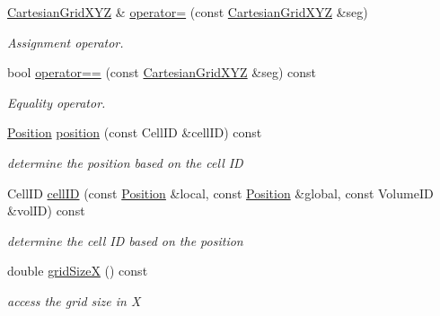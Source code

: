 \begin{DoxyCompactItemize}
\hyperlink{class_d_d4hep_1_1_geometry_1_1_cartesian_grid_x_y_z}{CartesianGridXYZ} \& \hyperlink{class_d_d4hep_1_1_geometry_1_1_cartesian_grid_x_y_z_aee2dbcb91803bc3d6ca773ae722ce716}{operator=} (const \hyperlink{class_d_d4hep_1_1_geometry_1_1_cartesian_grid_x_y_z}{CartesianGridXYZ} \&seg)
\begin{DoxyCompactList}\small\item\em Assignment operator. \item\end{DoxyCompactList}\item 
bool \hyperlink{class_d_d4hep_1_1_geometry_1_1_cartesian_grid_x_y_z_a35dac1689f0207c26e105c88e4529c9f}{operator==} (const \hyperlink{class_d_d4hep_1_1_geometry_1_1_cartesian_grid_x_y_z}{CartesianGridXYZ} \&seg) const 
\begin{DoxyCompactList}\small\item\em Equality operator. \item\end{DoxyCompactList}\item 
\hyperlink{namespace_d_d4hep_1_1_geometry_a55083902099d03506c6db01b80404900}{Position} \hyperlink{class_d_d4hep_1_1_geometry_1_1_cartesian_grid_x_y_z_a4afc0aea9df70160b0ff05220fd833ec}{position} (const CellID \&cellID) const 
\begin{DoxyCompactList}\small\item\em determine the position based on the cell ID \item\end{DoxyCompactList}\item 
CellID \hyperlink{class_d_d4hep_1_1_geometry_1_1_cartesian_grid_x_y_z_a44f2e080527e66de8098d96f383f8cfe}{cellID} (const \hyperlink{namespace_d_d4hep_1_1_geometry_a55083902099d03506c6db01b80404900}{Position} \&local, const \hyperlink{namespace_d_d4hep_1_1_geometry_a55083902099d03506c6db01b80404900}{Position} \&global, const VolumeID \&volID) const 
\begin{DoxyCompactList}\small\item\em determine the cell ID based on the position \item\end{DoxyCompactList}\item 
double \hyperlink{class_d_d4hep_1_1_geometry_1_1_cartesian_grid_x_y_z_a58daa680e61ef2805819c8cb2674ca7b}{gridSizeX} () const 
\begin{DoxyCompactList}\small\item\em access the grid size in X \item\end{DoxyCompactList}\item 

\end{DoxyCompactItemize}
